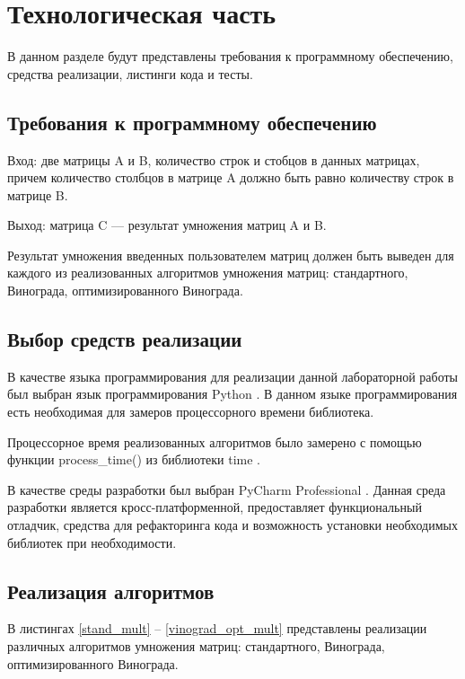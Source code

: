 \chapter{Технологическая часть}

В данном разделе будут представлены требования к программному обеспечению, средства реализации, листинги кода и тесты.

\section{Требования к программному обеспечению}
Вход: две матрицы A и B, количество строк и стобцов в данных матрицах, причем количество столбцов в матрице A должно быть равно количеству строк в матрице B.

Выход: матрица C --- результат умножения матриц A и B.

Результат умножения введенных пользователем матриц должен быть выведен для каждого из реализованных алгоритмов умножения матриц: стандартного, Винограда, оптимизированного Винограда.

\section{Выбор средств реализации}

В качестве языка программирования для реализации данной лабораторной работы был выбран язык программирования Python  \cite{PythonBook}. В данном языке программирования есть необходимая для замеров процессорного времени библиотека.

Процессорное время реализованных алгоритмов было замерено с помощью функции process\_time() из библиотеки time \cite{process_time_text}.

В качестве среды разработки был выбран PyCharm Professional \cite{pycharm}. Данная среда разработки является кросс-платформенной, предоставляет функциональный отладчик, средства для рефакторинга кода и возможность установки необходимых библиотек при необходимости.

\section{Реализация алгоритмов}

В листингах \ref{stand_mult} -- \ref{vinograd_opt_mult} представлены реализации различных алгоритмов умножения матриц: стандартного, Винограда, оптимизированного Винограда.

